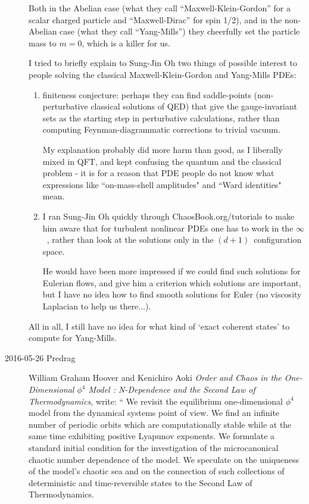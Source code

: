 \begin{description}
Both in the Abelian case (what they call ``Maxwell-Klein-Gordon'' for a
scalar charged particle and ``Maxwell-Dirac'' for spin 1/2), and in the
non-Abelian case (what they call ``Yang-Mills'') they cheerfully set the
particle mass to $m=0$, which is a killer for us.

I tried to briefly explain to Sung-Jin Oh two things of possible interest
to people solving the classical Maxwell-Klein-Gordon and Yang-Mills PDEs:

\begin{enumerate}
  \item
{}
{finiteness conjecture}: perhaps they can find saddle-points
(non-perturbative classical solutions of QED) that give the
gauge-invariant sets as the starting step in perturbative calculations,
rather than computing Feynman-diagrammatic corrections to trivial vacuum.

My explanation probably did more harm than good, as I liberally mixed in
QFT, and kept confusing the quantum and the classical problem - it is for
a reason that PDE people do not know what expressions like
``on-mass-shell amplitudes" and ``Ward identities" mean.

  \item
I ran Sung-Jin Oh quickly through 
{ChaosBook.org/tutorials} to make him aware that for turbulent nonlinear
PDEs one has to work in the $\infty$\dmn\ \statesp, rather than look at
the solutions only in the $(d+1)$\dmn\ configuration space.

He would have been more impressed if we could find such solutions for
Eulerian flows, and give him a criterion which solutions are important,
but I have no idea how to find smooth solutions for Euler (no viscosity
Laplacian to help us there...).

\end{enumerate}

All in all, I still have no idea for what kind of `exact coherent states'
to compute for Yang-Mills.

\item[2016-05-26 Predrag]
William Graham Hoover and Kenichiro Aoki
{\em Order and Chaos in the One-Dimensional $\phi^4$ Model : N-Dependence and
  the Second Law of Thermodynamics},  write: ``
  We revisit the equilibrium one-dimensional $\phi^4$ model from the dynamical
systems point of view. We find an infinite number of periodic orbits which are
computationally stable while at the same time exhibiting positive Lyapunov
exponents. We formulate a standard initial condition for the investigation of
the microcanonical chaotic number dependence of the model. We speculate on the
uniqueness of the model's chaotic sea and on the connection of such collections
of deterministic and time-reversible states to the Second Law of
Thermodynamics.


\end{description}
